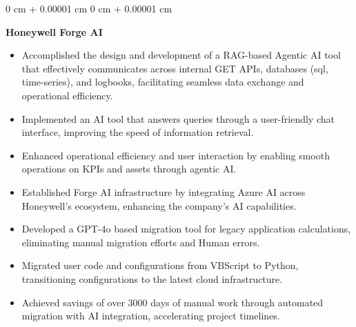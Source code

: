 \documentclass[10pt, letterpaper]{article}
\newenvironment{highlights}{
    \begin{itemize}[
        topsep=0.03 cm,
        parsep=0.02 cm,
        partopsep=0pt,
        itemsep=0pt,
        leftmargin=0 cm + 5pt
    ]
}{
    \end{itemize}
} %
\newenvironment{onecolentry}{
    \begin{adjustwidth}{
        0 cm + 0.00001 cm
    }{
        0 cm + 0.00001 cm
    }
}{
    \end{adjustwidth}
} %
\begin{document}
\begin{onecolentry}
\begin{adjustwidth}{0.4cm}{0cm}
\begin{highlights}
                \end{highlights}
            \end{adjustwidth}

            \vspace{0.2 cm}
            \textbf{Honeywell Forge AI} \\  
            \begin{adjustwidth}{0.4cm}{0cm}
                \begin{highlights}
                    \item Accomplished the design and development of a RAG-based Agentic AI tool that effectively communicates across internal GET APIs, databases (sql, time-series), and logbooks, facilitating seamless data exchange and operational efficiency.
                    \item Implemented an AI tool that answers queries through a user-friendly chat interface, improving the speed of information retrieval.
                    \item Enhanced operational efficiency and user interaction by enabling smooth operations on KPIs and assets through agentic AI.
                    \item Established Forge AI infrastructure by integrating Azure AI across Honeywell's ecosystem, enhancing the company's AI capabilities.
                    \item Developed a GPT-4o based migration tool for legacy application calculations, eliminating manual migration efforts and Human errors.
                    \item Migrated user code and configurations from VBScript to Python, transitioning configurations to the latest cloud infrastructure.
                    \item Achieved savings of over 3000 days of manual work through automated migration with AI integration, accelerating project timelines.
                    
                \end{highlights}
            \end{adjustwidth}


\end{onecolentry}
\end{document}
